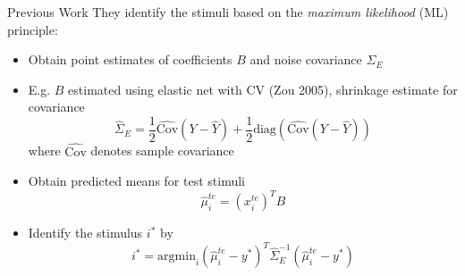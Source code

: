 \documentclass[final]{beamer}
\newlength{\onecolwid}
\begin{document}
\begin{frame}[t]
\begin{columns}[t]
\begin{column}{\onecolwid}
\begin{block}{Previous Work}
They identify the stimuli based on the \emph{maximum likelihood} (ML) principle:

\begin{itemize}
\item Obtain point estimates of coefficients $B$ and noise covariance $\Sigma_E$
\item E.g. $B$ estimated using elastic net with CV (Zou 2005),
shrinkage estimate for covariance
\[
\hat{\Sigma}_E = \frac{1}{2}\hat{\text{Cov}}(Y - \hat{Y}) + \frac{1}{2}\text{diag}(\hat{\text{Cov}}(Y - \hat{Y}))
\]
where $\hat{\text{Cov}}$ denotes sample covariance
\item Obtain predicted means for test stimuli
\[
\hat{\mu}_i^{te} = (x_i^{te})^T B
\]
\item Identify the stimulus $i^*$ by
\[
i^* = \text{argmin}_{i} (\hat{\mu}_i^{te} - y^*)^T \hat{\Sigma}_E^{-1} (\hat{\mu}_i^{te} - y^*)
\]
\end{itemize}
\end{block}


\end{column}
\end{columns}
\end{frame}
\end{document}
